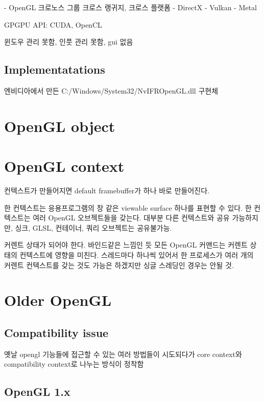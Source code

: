 \documentclass[a4paper]{report}
\begin{document}
- OpenGL
	크로노스 그룹
	크로스 랭귀지, 크로스 플랫폼
- DirectX
- Vulkan
- Metal

GPGPU API: CUDA, OpenCL


윈도우 관리 못함, 인풋 관리 못함, gui 없음

\subsection{Implementatations}
엔비디아에서 만든 
C:/Windows/System32/NvIFROpenGL.dll
구현체







\section{OpenGL object}







\section{OpenGL context}


컨텍스트가 만들어지면 default framebuffer가 하나 바로 만들어진다.

한 컨텍스트는 응용프로그램의 창 같은 viewable surface 하나를 표현할 수 있다.
한 컨텍스트는 여러 OpenGL 오브젝트들을 갖는다. 대부분 다른 컨텍스트와 공유 가능하지만, 싱크, GLSL, 컨테이너, 쿼리 오브젝트는 공유불가능.

커렌트 상태가 되어야 한다.
바인드같은 느낌인 듯
모든  OpenGL 커맨드는 커렌트 상태의 컨텍스트에 영향을 미친다. 스레드마다 하나씩 있어서 한 프로세스가 여러 개의 커렌트 컨텍스트를 갖는 것도 가능은 하겠지만 싱글 스레딩인 경우는 안될 것.



\section{Older OpenGL}


\subsection{Compatibility issue}
옛날 opengl 기능들에 접근할 수 있는 여러 방법들이 시도되다가 core context와 compatibility context로 나누는 방식이 정착함


\subsection{OpenGL 1.x}
\end{document}
